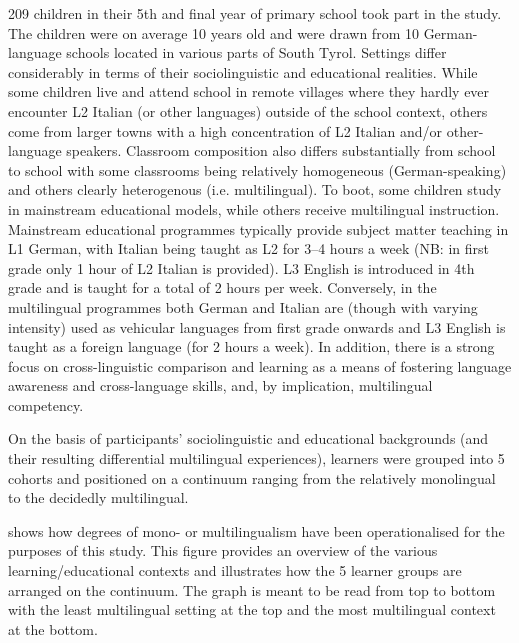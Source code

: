 \documentclass[output=paper]{../langscibook}
\begin{document}
209 children in their 5th and final year of primary school took part in the study. The children were on average 10 years old and were drawn from 10 German-language schools located in various parts of South Tyrol. Settings differ considerably in terms of their sociolinguistic and educational realities. While some children live and attend school in remote villages where they hardly ever encounter L2 Italian (or other languages) outside of the school context, others come from larger towns with a high concentration of L2 Italian and/or other-language speakers. Classroom composition also differs substantially from school to school with some classrooms being relatively homogeneous (German-speaking) and others clearly heterogenous (i.e. multilingual). To boot, some children study in mainstream educational models, while others receive multilingual instruction. Mainstream educational programmes typically provide subject matter teaching in L1 German, with Italian being taught as L2 for 3--4 hours a week (NB: in first grade only 1 hour of L2 Italian is provided). L3 English is introduced in 4th grade and is taught for a total of 2 hours per week. Conversely, in the multilingual programmes both German and Italian are (though with varying intensity) used as vehicular languages from first grade onwards and L3 English is taught as a foreign language (for 2 hours a week). In addition, there is a strong focus on cross-linguistic comparison and learning as a means of fostering language awareness and cross-language skills, and, by implication, multilingual competency.

On the basis of participants’ sociolinguistic and educational backgrounds (and their resulting differential multilingual experiences), learners were grouped into 5 cohorts and positioned on a continuum ranging from the relatively monolingual to the decidedly multilingual. 

 shows how degrees of mono- or multilingualism have been operationalised for the purposes of this study. This figure provides an overview of the various learning/educational contexts and illustrates how the 5 learner groups are arranged on the continuum. The graph is meant to be read from top to bottom with the least multilingual setting at the top and the most multilingual context at the bottom.
\end{document}
